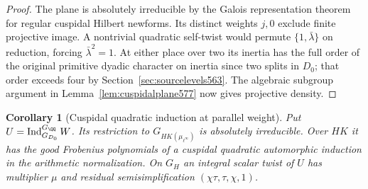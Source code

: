\documentclass[a4paper,11pt]{article}
\newtheorem{corollary}[proposition]{Corollary}
\theoremstyle{definition}
\theoremstyle{remark}
\numberwithin{equation}{section}
\begin{document}
\begin{proof}
The plane is absolutely irreducible by the Galois
representation theorem for regular cuspidal Hilbert newforms.
Its distinct weights \(j,0\) exclude finite projective image.
A nontrivial quadratic self-twist would permute
\(\{1,\bar\lambda\}\) on reduction, forcing
\(\bar\lambda^2=1\). At either place over two its inertia
has the full order of the original primitive dyadic
character on inertia since two splits in \(D_0\); that
order exceeds four by Section~\ref{sec:sourcelevels563}.
The algebraic subgroup argument in
Lemma~\ref{lem:cuspidalplane577} now gives projective density.
\end{proof}

\begin{corollary}[Cuspidal quadratic induction at parallel weight]
\leavevmode\label{cor:parallelind578}
Put \(U=\operatorname{Ind}_{G_{D_0}}^{G_\QQ}W\).
Its restriction to \(G_{HK(\mu_{\ell^\infty})}\) is absolutely
irreducible. Over \(HK\) it has the good Frobenius polynomials
of a cuspidal quadratic automorphic induction in the arithmetic
normalization. On \(G_H\) an integral scalar twist of \(U\)
has multiplier \(\mu\) and residual semisimplification
\((\chi\tau,\tau,\chi,1)\).
\end{corollary}
\end{document}
